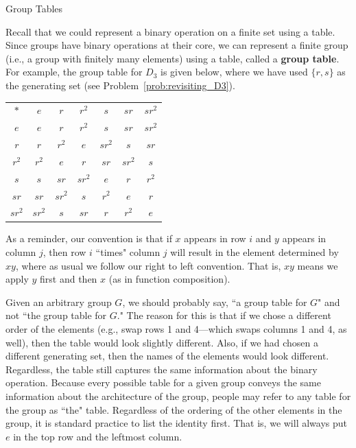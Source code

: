 \begin{section}{Group Tables}


Recall that we could represent a binary operation on a finite set using a table.  Since groups have binary operations at their core, we can represent a finite group (i.e., a group with finitely many elements) using a table, called a \textbf{group table}. For example, the group table for $D_3$ is given below, where we have used $\{r,s\}$ as the generating set (see Problem~\ref{prob:revisiting_D3}).

\begin{center}
\begin{tabular}{c!{\vrule width 2pt}c|c|c|c|c|c}
$*$ & $e$ & $r$ & $r^2$ & $s$ & $sr$ & $sr^2$\\ 
$e$ & $e$ & $r$ & $r^2$ & $s$ & $sr$ & $sr^2$\\
\hline $r$ & $r$ & $r^2$ & $e$ & $sr^2$ & $s$ & $sr$ \\
\hline $r^2$ & $r^2$ & $e$ & $r$ & $sr$ & $sr^2$ & $s$\\
\hline $s$ & $s$ & $sr$ & $sr^2$ & $e$ & $r$ & $r^2$\\
\hline $sr$ & $sr$ & $sr^2$ & $s$ & $r^2$ & $e$ & $r$\\
\hline $sr^2$ & $sr^2$ & $s$ & $sr$ & $r$ & $r^2$ & $e$ 
\end{tabular}
\end{center}

As a reminder, our convention is that if $x$ appears in row $i$ and $y$ appears in column $j$, then row $i$ ``times" column $j$ will result in the element determined by $xy$, where as usual we follow our right to left convention.  That is, $xy$ means we apply $y$ first and then $x$ (as in function composition).

Given an arbitrary group $G$, we should probably say, ``a group table for $G$" and not ``the group table for $G$."  The reason for this is that if we chose a different order of the elements (e.g., swap rows 1 and 4---which swaps columns 1 and 4, as well), then the table would look slightly different.  Also, if we had chosen a different generating set, then the names of the elements would look different.  Regardless, the table still captures the same information about the binary operation. Because every possible table for a given group conveys the same information about the architecture of the group, people may refer to any table for the group as ``the" table. Regardless of the ordering of the other elements in the group, it is standard practice to list the identity first. That is, we will always put $e$ in the top row and the leftmost column.


\end{section}
